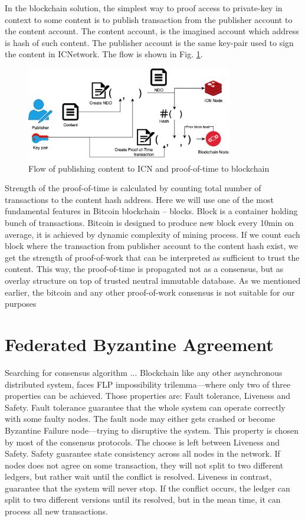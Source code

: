 \documentclass[nostrict]{szablonPG}
\begin{document}
In the blockchain solution, the simplest way to proof access to private-key in context to some content is to publish transaction from the publisher account to the content account. The content account, is the imagined account which address is hash of such content. The publisher account is the same key-pair used to sign the content in ICNetwork. The flow is shown in Fig. \ref{fig:distribution-flow}.
\begin{figure}[h!]
\includegraphics[width=9cm]{img/distribution-flow.png}
\centering
\caption{Flow of publishing content to ICN and proof-of-time to blockchain}
\label{fig:distribution-flow}
\end{figure} 
Strength of the proof-of-time is calculated by counting total number of transactions to the content hash address. Here we will use one of the most fundamental features in Bitcoin blockchain -- blocks. Block is a container holding bunch of transactions. Bitcoin is designed to produce new block every 10min on average, it is achieved by dynamic complexity of mining process. If we count each block where the transaction from publisher account to the content hash exist, we get the strength of proof-of-work that can be interpreted as sufficient to trust the content. This way, the proof-of-time is propagated not as a consensus, but as overlay structure on top of trusted neutral immutable database. 
As we mentioned earlier, the bitcoin and any other proof-of-work consensus is not suitable for our purposes


\section{Federated Byzantine Agreement}
Searching for consensus algorithm ...
Blockchain like any other asynchronous distributed system, faces FLP\cite{fischer1985impossibility} impossibility trilemma---where only two of three properties can be achieved. Those properties are: Fault tolerance, Liveness and Safety. Fault tolerance guarantee that the whole system can operate correctly with some faulty nodes. The fault node may either gets crashed or become Byzantine Failure node---trying to disruptive the system.
This property is chosen by most of the consensus protocols. The choose is left between Liveness and Safety. Safety guarantee state consistency across all nodes in the network. If nodes does not agree on some transaction, they will not split to two different ledgers, but rather wait until the conflict is resolved. Liveness in contrast, guarantee that the system will never stop. If the conflict occurs, the ledger can split to two different versions until its resolved, but in the mean time, it can process all new transactions.
\end{document}
